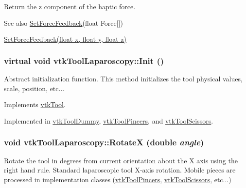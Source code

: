 Return the z component of the haptic force. \begin{DoxySeeAlso}{See also}
\hyperlink{classvtkToolLaparoscopy_a9bbfa040ca224472e6c669a3c27d9977}{SetForceFeedback}(float Force\mbox{[}\mbox{]}) 

\hyperlink{classvtkToolLaparoscopy_aa716d470104640646068eaa160a7adf2}{SetForceFeedback(float x, float y, float z)} 
\end{DoxySeeAlso}
\hypertarget{classvtkToolLaparoscopy_ace75ea21a3ddb27547976ddea0ebb60e}{
\subsubsection[{Init}]{\setlength{\rightskip}{0pt plus 5cm}virtual void vtkToolLaparoscopy::Init ()}}
\label{classvtkToolLaparoscopy_ace75ea21a3ddb27547976ddea0ebb60e}


Abstract initialization function. This method initializes the tool physical values, scale, position, etc... 

Implements \hyperlink{classvtkTool_a6b9e7743cde1b61b252abef17248a913}{vtkTool}.

Implemented in \hyperlink{classvtkToolDummy_aaf4c69a9c0fc3432e678ca9fffc913dc}{vtkToolDummy}, \hyperlink{classvtkToolPincers_ae4918610073324c94dddd8da234742a9}{vtkToolPincers}, and \hyperlink{classvtkToolScissors_a5fc5884ce0fd1723ecf86888bdbba7a6}{vtkToolScissors}.\hypertarget{classvtkToolLaparoscopy_a6894dddee203102828358697e8214974}{
\subsubsection[{RotateX}]{\setlength{\rightskip}{0pt plus 5cm}void vtkToolLaparoscopy::RotateX (double {\em angle})}}
\label{classvtkToolLaparoscopy_a6894dddee203102828358697e8214974}


Rotate the tool in degrees from current orientation about the X axis using the right hand rule. Standard laparoscopic tool X-\/axis rotation. Mobile pieces are processed in implementation classes (\hyperlink{classvtkToolPincers}{vtkToolPincers}, \hyperlink{classvtkToolScissors}{vtkToolScissors}, etc...) 


